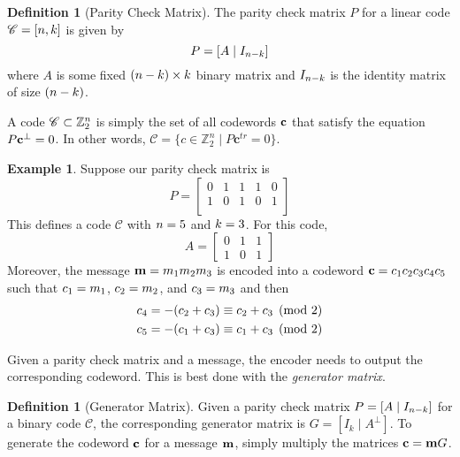 \documentclass[12pt,twoside]{reedthesis}
\theoremstyle{definition}
\newtheorem{definition}[theorem]{Definition}
\newtheorem{example}[theorem]{Example}
\newcommand{\Z}{\mathbb{Z}}
\begin{document}
\begin{definition}[Parity Check Matrix] The parity check matrix $P$ for a linear code $\mathscr{C} = [n, k]$ is given by 
\begin{equation*}
P = [A \mid I_{n-k}]
\end{equation*}
where $A$ is some fixed $(n-k) \times k$ binary matrix and $I_{n-k}$ is the identity matrix of size $(n-k)$.
\end{definition}
A code $\mathscr{C}\subset \Z_2^\clen$ is simply the set of all codewords $\mathbf{c}$ that satisfy the equation $P\mathbf{c}^{\bot} = 0$. In other words, $\mathscr{C} = \{c\in \Z_2^n \mid P\mathbf{c}^{tr} = 0\}$.
\begin{example} \label{P_ex} Suppose our parity check matrix is
\begin{equation*}
P = 
\left[
\begin{array}{ccc|cc}
0 & 1 & 1 & 1 & 0 \\
1 & 0 & 1 & 0 & 1\\
\end{array}
\right]
\end{equation*}
This defines a code $\mathscr{C}$ with $n = 5$ and $k = 3$. For this code,
\begin{equation*}
A = 
\begin{bmatrix}
0 & 1 & 1\\
1 & 0 & 1
\end{bmatrix}
\end{equation*}
Moreover, the message $\mathbf{m} = m_{1}m_{2}m_{3}$ is encoded into a codeword $\mathbf{c} = c_{1}c_{2}c_{3}c_{4}c_{5}$ such that $c_{1} = m_{1}$, $c_{2} = m_{2}$, and $c_{3} = m_{3}$ and then
\begin{align*}
& c_{4} = -(c_{2} + c_{3}) \equiv c_{2} + c_{3} \pmod 2\\
& c_{5} =  -(c_{1} + c_{3}) \equiv c_{1} + c_{3} \pmod 2
\end{align*}
\end{example}

Given a parity check matrix and a message, the encoder needs to output the corresponding codeword. This is best done with the \textit{generator matrix}.

\begin{definition}[Generator Matrix] Given a parity check matrix $P = [A\mid I_{n-k}]$ for a binary code $\mathscr{C}$, the corresponding generator matrix is $G = [I_k \mid A^{\bot}]$.
To generate the codeword $\mathbf{c}$ for a message $\mathbf{m}$, simply multiply the matrices $\mathbf{c} = \mathbf{m} G$.
\end{definition}
\end{document}
